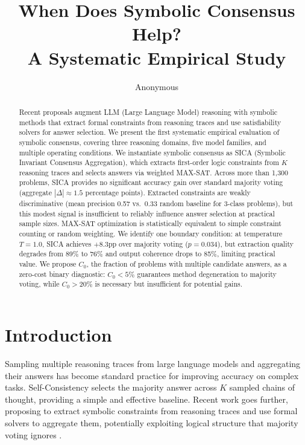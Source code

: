 \documentclass[11pt]{article}
\title{When Does Symbolic Consensus Help?\\A Systematic Empirical Study}
\author{Anonymous}
\date{}
\begin{document}
\maketitle

\begin{abstract}
Recent proposals augment LLM (Large Language Model) reasoning with symbolic methods that extract formal constraints from reasoning traces and use satisfiability solvers for answer selection.
We present the first systematic empirical evaluation of symbolic consensus, covering three reasoning domains, five model families, and multiple operating conditions.
We instantiate symbolic consensus as SICA (Symbolic Invariant Consensus Aggregation), which extracts first-order logic constraints from $K$ reasoning traces and selects answers via weighted MAX-SAT.
Across more than 1{,}300 problems, SICA provides no significant accuracy gain over standard majority voting (aggregate $|\Delta|\approx1.5$ percentage points).
Extracted constraints are weakly discriminative (mean precision 0.57 vs.\ 0.33 random baseline for 3-class problems), but this modest signal is insufficient to reliably influence answer selection at practical sample sizes.
MAX-SAT optimization is statistically equivalent to simple constraint counting or random weighting.
We identify one boundary condition: at temperature $T{=}1.0$, SICA achieves $+8.3$pp over majority voting ($p{=}0.034$), but extraction quality degrades from 89\% to 76\% and output coherence drops to 85\%, limiting practical value.
We propose $C_0$, the fraction of problems with multiple candidate answers, as a zero-cost binary diagnostic: $C_0{<}5\%$ guarantees method degeneration to majority voting, while $C_0{>}20\%$ is necessary but insufficient for potential gains.
\end{abstract}

\section{Introduction}

Sampling multiple reasoning traces from large language models and aggregating their answers has become standard practice for improving accuracy on complex tasks.
Self-Consistency \citep{wang2023selfconsistency} selects the majority answer across $K$ sampled chains of thought, providing a simple and effective baseline.
Recent work goes further, proposing to extract symbolic constraints from reasoning traces and use formal solvers to aggregate them, potentially exploiting logical structure that majority voting ignores \citep{pan2023logiclm,olausson2023linc}.
\end{document}
